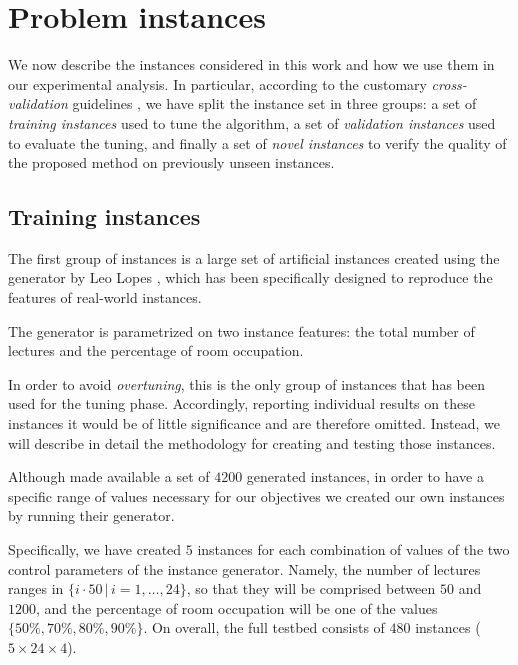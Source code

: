 \documentclass[authoryear,12pt]{article}
\begin{document}
\section{Problem instances}
\label{sec:instances}

We now describe the instances considered in this work and how we use them in our
experimental analysis. In particular, according to the customary
\emph{cross-validation} guidelines \citep[e.g.,][]{HaTF2009}, we have split the
instance set in three groups: a set of \emph{training instances} used to tune
the algorithm, a set of \emph{validation instances} used to evaluate the tuning,
and finally a set of \emph{novel instances} to verify the quality of the
proposed method on previously unseen instances.

\subsection{Training instances}
\label{sec:artificial-instances}

The first group of instances is a large set of artificial instances created
using the generator by Leo Lopes \cite[see][]{LoMi10}, which has been
specifically designed to reproduce the features of real-world instances.


The generator is parametrized on two instance features: the total number of
lectures and the percentage of room occupation.

In order to avoid \emph{overtuning}, this is the only group of instances that
has been used for the tuning phase. Accordingly, reporting individual results on
these instances it would be of little significance and are therefore omitted.
Instead, we will describe in detail the methodology for creating and testing
those instances.

Although \citet{LoMi10} made available a set of $4200$ generated instances, in
order to have a specific range of values necessary for our objectives we created
our own instances by running their generator.

Specifically, we have created $5$ instances for each combination of values of
the two control parameters of the instance generator. Namely, the number of
lectures ranges in $\{i\cdot 50\, |\, i = 1, \ldots, 24\}$, so that they will be
comprised between $50$ and $1200$, and the percentage of room occupation will be
one of the values $\{50\%, 70\%, 80\%, 90\%\}$. On overall, the full testbed
consists of $480$ instances ($5 \times 24 \times 4$).
\end{document}
